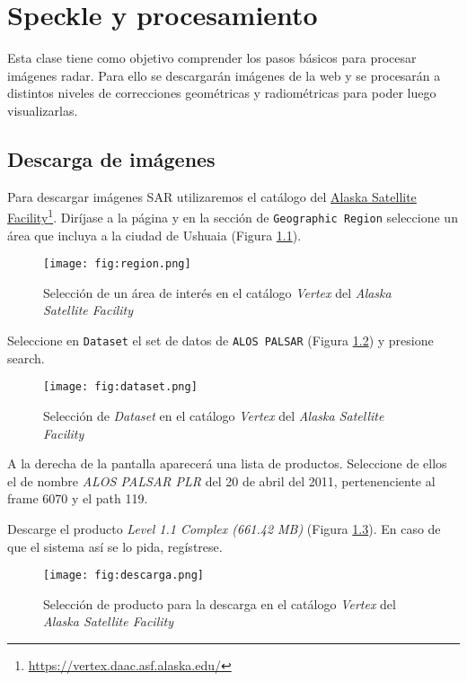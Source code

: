 \chapter{Speckle y procesamiento}

Esta clase tiene como objetivo comprender los pasos básicos para procesar imágenes radar. Para ello se descargarán imágenes de la web y se procesarán a distintos niveles de correcciones geométricas y radiométricas para poder luego visualizarlas.

\section{Descarga de imágenes}

Para descargar imágenes SAR utilizaremos el catálogo del \href{https://vertex.daac.asf.alaska.edu/}{Alaska Satellite Facility}\footnote{\href{https://vertex.daac.asf.alaska.edu/}{https://vertex.daac.asf.alaska.edu/}}. Diríjase a la página y en la sección de \texttt{Geographic Region} seleccione un área que incluya a la ciudad de Ushuaia (Figura \ref{fig:region}).

\begin{figure}[h!]
    \centering
    \texttt{[image: fig:region.png]}
    \caption{Selección de un área de interés en el catálogo \emph{Vertex} del \emph{Alaska Satellite Facility}}
    \label{fig:region}
\end{figure}

Seleccione en \texttt{Dataset} el set de datos de \texttt{ALOS PALSAR} (Figura \ref{fig:dataset}) y presione search.

\begin{figure}[h!]
    \centering
    \texttt{[image: fig:dataset.png]}
    \caption{Selección de \emph{Dataset} en el catálogo \emph{Vertex} del \emph{Alaska Satellite Facility}}
    \label{fig:dataset}
\end{figure}

A la derecha de la pantalla aparecerá una lista de productos. Seleccione de ellos el de nombre \emph{ALOS PALSAR PLR} del 20 de abril del 2011, pertenenciente al frame 6070 y el path 119.

Descarge el producto \emph{Level 1.1 Complex (661.42 MB)} (Figura \ref{fig:descarga}). En caso de que el sistema así se lo pida, regístrese.

\begin{figure}[h!]
    \centering
    \texttt{[image: fig:descarga.png]}
    \caption{Selección de producto para la descarga en el catálogo \emph{Vertex} del \emph{Alaska Satellite Facility}}
    \label{fig:descarga}
\end{figure}

